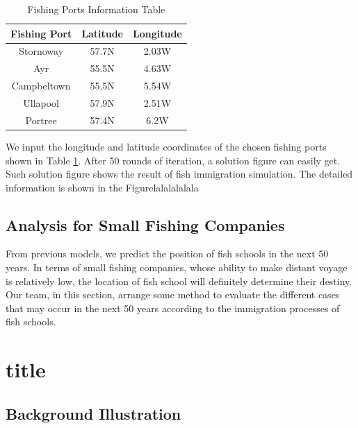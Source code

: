 \documentclass{mcmthesis}
\begin{document}
\begin{table}[H]\normalsize
    \centering
    \caption{Fishing Ports Information Table}
    \label{loca}
    \begin{tabular}{c c c}
\toprule[2pt]
        Fishing Port & Latitude & Longitude\\
\hline
    Stornoway & 57.7N & 2.03W\\
    Ayr & 55.5N & 4.63W\\
    Campbeltown & 55.5N & 5.54W\\
    Ullapool & 57.9N & 2.51W\\
    Portree & 57.4N & 6.2W\\
\bottomrule[2pt]
    \end{tabular}
\end{table}
    \par
	We input the longitude and latitude coordinates of the chosen fishing ports shown in Table \ref{loca}. After 50 rounds of iteration, a solution figure can easily get. Such solution figure shows the  result of fish immigration simulation. The detailed information is shown in the Figurelalalalalala \par %



\subsection{Analysis for Small Fishing Companies}\label{S4s3}
	From previous models, we predict the position of fish schools in the next 50 years. In terms of small fishing companies, whose ability to make distant voyage is relatively low, the location of fish school will definitely determine their destiny. Our team, in this section, arrange some method to evaluate the different cases that may occur in the next 50 years according to the immigration processes of fish schools.\par
	    
	    
	    
\section{title}\label{S5}

\subsection{Background Illustration}
   
\end{document}
